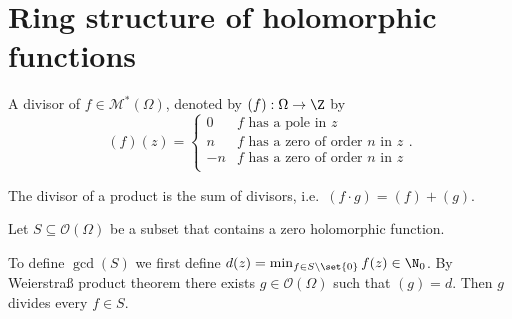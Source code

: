 \section{Ring structure of holomorphic functions}
\begin{definicija}
    A divisor of $f \in \mathcal{M}^*(\Omega)$, denoted by $(f) : \Omega \rightarrow \Z$ by 
    $$
        (f)(z) = \begin{cases}
            0 & \text{$f$ has a pole in $z$} \\
            n & \text{$f$ has a zero of order $n$ in $z$} \\
            -n & \text{$f$ has a zero of order $n$ in $z$} \\
        \end{cases}.
    $$
\end{definicija}
\begin{opomba}
    The divisor of a product is the sum of divisors, i.e.\ $(f \cdot g) = (f) + (g)$.
\end{opomba}

\begin{definicija}
    Let $S \subseteq \mathcal{O}(\Omega)$ be a subset that contains a zero holomorphic function.

    To define $\gcd(S)$ we first define $d(z) = \min_{f \in S \setminus \set{0}} f(z) \in \N_0$. By Weierstraß product theorem there exists $g \in \mathcal{O}(\Omega)$ such that $(g) = d$. Then $g$ divides every $f \in S$.
\end{definicija}

